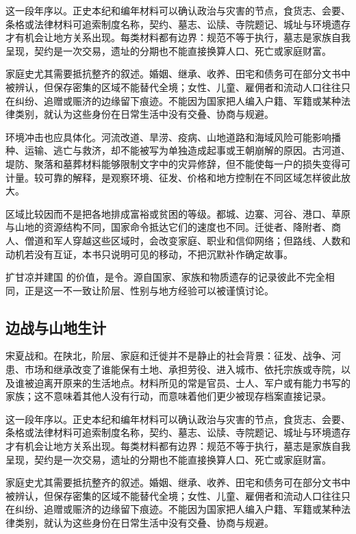 这一段年序以。正史本纪和编年材料可以确认政治与灾害的节点，食货志、会要、条格或法律材料可追索制度名称，契约、墓志、讼牍、寺院题记、城址与环境遗存才有机会让地方关系出现。每类材料都有边界：规范不等于执行，墓志是家族自我呈现，契约是一次交易，遗址的分期也不能直接换算人口、死亡或家庭财富。

家庭史尤其需要抵抗整齐的叙述。婚姻、继承、收养、田宅和债务可在部分文书中被辨认，但保存密集的区域不能替代全境；女性、儿童、雇佣者和流动人口往往只在纠纷、追赠或赈济的边缘留下痕迹。不能因为国家把人编入户籍、军籍或某种法律类别，就认为这些身份在日常生活中没有交叠、协商与规避。

环境冲击也应具体化。河流改道、旱涝、疫病、山地道路和海域风险可能影响播种、运输、逃亡与救济，却不能被写为单独造成起事或王朝崩解的原因。古河道、堤防、聚落和墓葬材料能够限制文字中的灾异修辞，但不能使每一户的损失变得可计量。较可靠的解释，是观察环境、征发、价格和地方控制在不同区域怎样彼此放大。

区域比较因而不是把各地排成富裕或贫困的等级。都城、边寨、河谷、港口、草原与山地的资源结构不同，国家命令抵达它们的速度也不同。迁徙者、降附者、商人、僧道和军人穿越这些区域时，会改变家庭、职业和信仰网络；但路线、人数和动机若没有互证，本书只说明可见的移动，不把沉默补作确定故事。

扩甘凉并建国 的价值，是令。源自国家、家族和物质遗存的记录彼此不完全相同，正是这一不一致让阶层、性别与地方经验可以被谨慎讨论。

\subsection{边战与山地生计}

宋夏战和。在陕北，阶层、家庭和迁徙并不是静止的社会背景：征发、战争、河患、市场和继承改变了谁能保有土地、承担劳役、进入城市、依托宗族或寺院，以及谁被迫离开原来的生活地点。材料所见的常是官员、士人、军户或有能力书写的家族；这不意味着其他人没有行动，而意味着他们更少被现存档案直接记录。

这一段年序以。正史本纪和编年材料可以确认政治与灾害的节点，食货志、会要、条格或法律材料可追索制度名称，契约、墓志、讼牍、寺院题记、城址与环境遗存才有机会让地方关系出现。每类材料都有边界：规范不等于执行，墓志是家族自我呈现，契约是一次交易，遗址的分期也不能直接换算人口、死亡或家庭财富。

家庭史尤其需要抵抗整齐的叙述。婚姻、继承、收养、田宅和债务可在部分文书中被辨认，但保存密集的区域不能替代全境；女性、儿童、雇佣者和流动人口往往只在纠纷、追赠或赈济的边缘留下痕迹。不能因为国家把人编入户籍、军籍或某种法律类别，就认为这些身份在日常生活中没有交叠、协商与规避。


